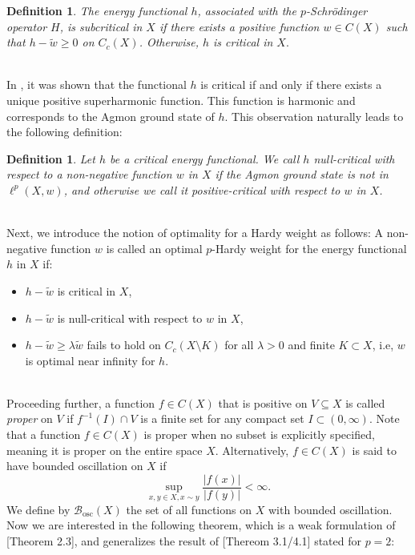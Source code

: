 \documentclass[11pt]{amsart}
\newtheorem{defn}[thm]{Definition}
\newcommand{\1}{[1]}
\begin{document}
\begin{defn} The energy functional $h$, associated with the $p$-Schrödinger operator $H$, is subcritical in $X$ if there exists a positive function $w \in C(X)$ such that $h - \widetilde{w} \geq 0$ on $C_c(X)$. Otherwise, $h$ is critical in $X.$
\end{defn}
\phantom{.}\\
In \cite{Fis22}, it was shown that the functional $h$ is critical if and only if there exists a unique positive superharmonic function. This function is harmonic and corresponds to the Agmon ground state of $h$. This observation naturally leads to the following definition:
\begin{defn}
Let $h$ be a critical energy functional. We call $h$ null-critical with respect to a non-negative function $w$ in $X$ if the Agmon ground state is not in $\ell^p(X, w)$, and otherwise we call it positive-critical with respect to $w$ in $X$.
\end{defn}
\phantom{.} \\
Next, we introduce the notion of optimality for a Hardy weight as follows: A non-negative function $w$ is called an optimal $p$-Hardy weight for the energy functional $h$ in $X$ if:
\begin{itemize}
    \item[$\bullet$] $h - \tilde{w}$ is critical in $X$,
    \item[$\bullet$] $h - \tilde{w}$ is null-critical with respect to $w$ in $X$,
    \item[$\bullet$] $h - \tilde{w} \geq \lambda \tilde{w}$ fails to hold on $C_c(X \setminus K)$ for all $\lambda > 0$ and finite $K \subset X$, i.e, $w$ is optimal near infinity for $h$.
\end{itemize}
\phantom{.}\\
Proceeding further, a function $f \in C(X)$ that is positive on $V \subseteq X$ is called \textit{proper} on $V$ if $f^{-1}(I) \cap V$ is a finite set for any compact set $I \subset (0, \infty)$.
Note that a function \( f \in C(X) \) is proper when no subset is explicitly specified, meaning it is proper on the entire space \( X \).
Alternatively, $f \in C(X)$ is said to have bounded oscillation on $X$ if $$ \sup_{x, y \in X, x \sim y} \frac{|f(x)|}{|f(y)|} < \infty.
$$
We define by $\mathcal{B}_{\text{osc}}(X)$ the set of all functions on $X$ with bounded oscillation.
Now we are interested in the following theorem, which is a weak formulation of \cite{Fis24}[Theorem 2.3], and generalizes the result of \cite{KPP18}[Thereom 3.1/4.1] stated for $p = 2$:
\end{document}

